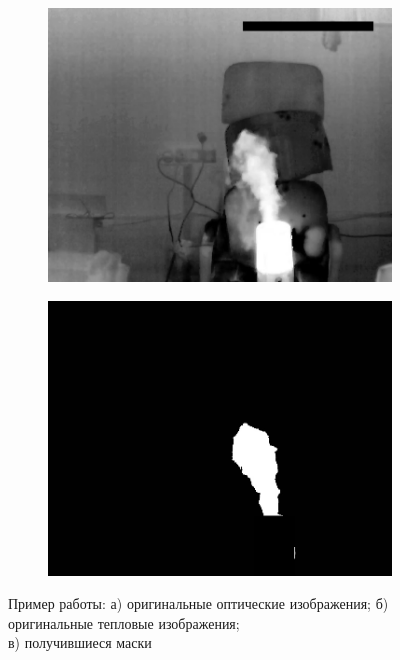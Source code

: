 \documentclass[t]{beamer}
\begin{document}
\begin{frame}
\begin{figure}[h!]
			\begin{subfigure}{.30\textwidth}
				\centering
				\includegraphics[width = \textwidth]{image/examples/tep/240}
				\caption{}
			\end{subfigure}
			\begin{subfigure}{.30\textwidth}
				\centering
				\includegraphics[width = \textwidth]{image/examples/mask/240}
				\caption{}
			\end{subfigure}
			\vspace{-0.3cm}
			\caption{Пример работы: а) оригинальные оптические изображения; б) оригинальные тепловые изображения;\\ в) получившиеся маски}
			\label{fig:test_segm}
		\end{figure}
	\end{frame}
\end{document}
